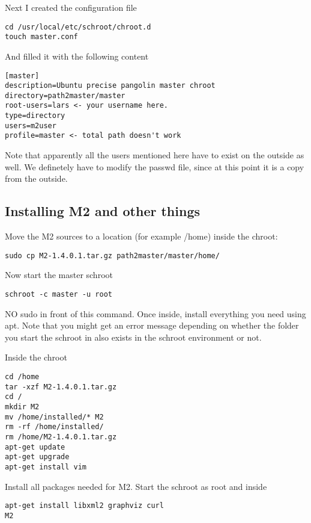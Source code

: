 \documentclass[a4paper]{book}
\begin{document}
Next I created the configuration file

\begin{verbatim}
cd /usr/local/etc/schroot/chroot.d
touch master.conf
\end{verbatim}

And filled it with the following content

\begin{verbatim}
[master]
description=Ubuntu precise pangolin master chroot
directory=path2master/master
root-users=lars <- your username here.
type=directory
users=m2user
profile=master <- total path doesn't work
\end{verbatim}

Note that apparently all the users mentioned here have to exist on the outside
as well.  We definetely have to modify the passwd file, since at this point it
is a copy from the outside.

\subsection{Installing M2 and other things}

Move the M2 sources to a location (for example /home) inside the chroot:

\begin{verbatim}
sudo cp M2-1.4.0.1.tar.gz path2master/master/home/
\end{verbatim}

Now start the master schroot

\begin{verbatim}
schroot -c master -u root
\end{verbatim}

NO sudo in front of this command. Once inside, install everything you need
using apt.  Note that you might get an error message depending on whether the
folder you start the schroot in also exists in the schroot environment or not.

Inside the chroot

\begin{verbatim}
cd /home
tar -xzf M2-1.4.0.1.tar.gz
cd /
mkdir M2
mv /home/installed/* M2
rm -rf /home/installed/
rm /home/M2-1.4.0.1.tar.gz
apt-get update
apt-get upgrade
apt-get install vim
\end{verbatim}

Install all packages needed for M2. Start the schroot as root and inside

\begin{verbatim}
apt-get install libxml2 graphviz curl
M2
\end{verbatim}
\end{document}
